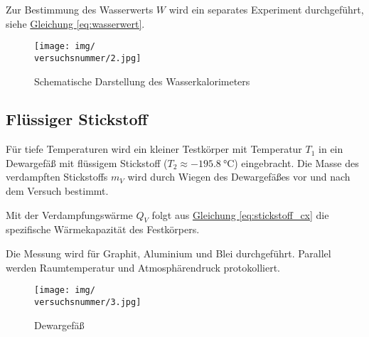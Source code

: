 Zur Bestimmung des Wasserwerts \(W\) wird ein separates Experiment durchgeführt, siehe \hyperref[eq:wasserwert]{Gleichung \ref*{eq:wasserwert}}.
\begin{figure}[h!]
    \centering
    \texttt{[image: img/\\versuchsnummer/2.jpg]}
    \caption{Schematische Darstellung des Wasserkalorimeters}
    \label{img:2}
\end{figure}

\subsection*{Flüssiger Stickstoff}
Für tiefe Temperaturen wird ein kleiner Testkörper mit Temperatur \(T_1\) in ein Dewargefäß mit flüssigem Stickstoff (\(T_2 \approx \SI{-195.8}{\celsius}\)) eingebracht. Die Masse des verdampften Stickstoffs \(m_V\) wird durch Wiegen des Dewargefäßes vor und nach dem Versuch bestimmt.  

Mit der Verdampfungswärme \(Q_V\) folgt aus \hyperref[eq:stickstoff_cx]{Gleichung \ref*{eq:stickstoff_cx}} die spezifische Wärmekapazität des Festkörpers.  

Die Messung wird für Graphit, Aluminium und Blei durchgeführt. Parallel werden Raumtemperatur und Atmosphärendruck protokolliert.
\begin{figure}[h!]
    \centering
    \texttt{[image: img/\\versuchsnummer/3.jpg]}
    \caption{Dewargefäß}
    \label{img:3}
\end{figure}